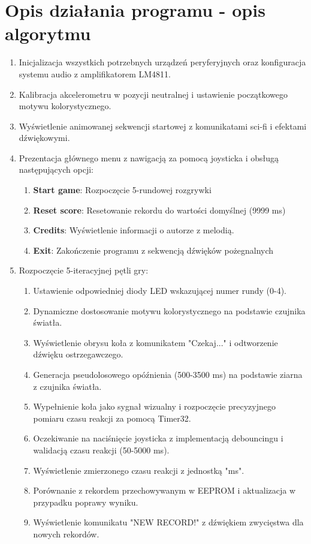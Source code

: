 \documentclass[a4paper,12pt]{report}
\begin{document}
\chapter{Opis działania programu - opis algorytmu}
\begin{enumerate}
\item Inicjalizacja wszystkich potrzebnych urządzeń peryferyjnych oraz konfiguracja systemu audio z amplifikatorem LM4811.
\item Kalibracja akcelerometru w pozycji neutralnej i ustawienie początkowego motywu kolorystycznego.
\item Wyświetlenie animowanej sekwencji startowej z komunikatami sci-fi i efektami dźwiękowymi.
\item Prezentacja głównego menu z nawigacją za pomocą joysticka i obsługą następujących opcji:
\begin{enumerate}
\item \textbf{Start game}: Rozpoczęcie 5-rundowej rozgrywki
\item \textbf{Reset score}: Resetowanie rekordu do wartości domyślnej (9999 ms)
\item \textbf{Credits}: Wyświetlenie informacji o autorze z melodią.
\item \textbf{Exit}: Zakończenie programu z sekwencją dźwięków pożegnalnych
\end{enumerate}
\item Rozpoczęcie 5-iteracyjnej pętli gry:
\begin{enumerate}
\item Ustawienie odpowiedniej diody LED wskazującej numer rundy (0-4).
\item Dynamiczne dostosowanie motywu kolorystycznego na podstawie czujnika światła.
\item Wyświetlenie obrysu koła z komunikatem "Czekaj..." i odtworzenie dźwięku ostrzegawczego.
\item Generacja pseudolosowego opóźnienia (500-3500 ms) na podstawie ziarna z czujnika światła.
\item Wypełnienie koła jako sygnał wizualny i rozpoczęcie precyzyjnego pomiaru czasu reakcji za pomocą Timer32.
\item Oczekiwanie na naciśnięcie joysticka z implementacją debouncingu i walidacją czasu reakcji (50-5000 ms).
\item Wyświetlenie zmierzonego czasu reakcji z jednostką "ms".
\item Porównanie z rekordem przechowywanym w EEPROM i aktualizacja w przypadku poprawy wyniku.
\item Wyświetlenie komunikatu "NEW RECORD!" z dźwiękiem zwycięstwa dla nowych rekordów.

\end{enumerate}
\end{enumerate}
\end{document}
